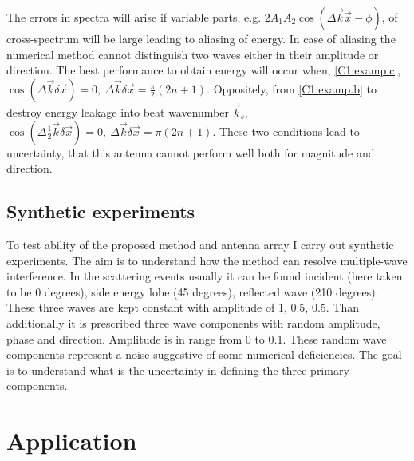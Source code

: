 The errors in spectra will arise if variable parts, e.g. $2A_1A_2 \cos(\Delta \vec{k} \vec{x} - \phi)$,  of cross-spectrum will be large leading to aliasing of energy. In case of aliasing the numerical method cannot distinguish two waves either in their amplitude or direction. The best performance to obtain energy will occur when, \eqref{C1:examp.c}, $\cos (\Delta \vec{k} \delta \vec{x}) = 0,~\Delta \vec{k} \delta \vec{x} = \frac{\pi}{2} (2n + 1)$. Oppositely, from \eqref{C1:examp.b} to destroy energy leakage into beat wavenumber $\vec{k}_s$, $\cos (\Delta \frac{1}{2}\vec{k} \delta \vec{x}) = 0,~\Delta \vec{k} \delta \vec{x} = \pi(2n + 1)$. These two conditions lead to uncertainty, that this antenna cannot perform well both for magnitude and direction. 

\subsection{Synthetic experiments}
To test ability of the proposed method and antenna array I carry out synthetic experiments. The aim is to understand how the method can resolve multiple-wave interference. In the scattering events usually it can be found incident (here taken to be 0 degrees), side energy lobe (45 degrees), reflected wave (210 degrees). These three waves are kept constant with amplitude of 1, 0.5, 0.5. Than additionally it is prescribed three wave components with random amplitude, phase and direction. Amplitude is in range from 0 to 0.1. These random wave components represent a noise suggestive of some numerical deficiencies. The goal is to understand what is the uncertainty in defining the three primary components.\\


\section{Application}
